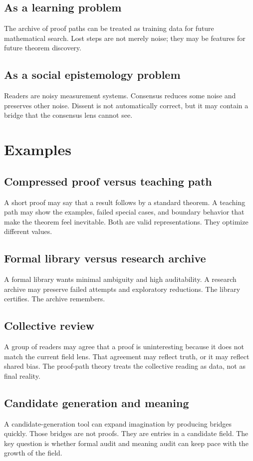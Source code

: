 \documentclass[11pt,oneside]{book}
\theoremstyle{remark}
\begin{document}
\subsection{As a learning problem}
The archive of proof paths can be treated as training data for future mathematical search.  Lost steps are not merely noise; they may be features for future theorem discovery.

\subsection{As a social epistemology problem}
Readers are noisy measurement systems.  Consensus reduces some noise and preserves other noise.  Dissent is not automatically correct, but it may contain a bridge that the consensus lens cannot see.

\section{Examples}

\subsection{Compressed proof versus teaching path}
A short proof may say that a result follows by a standard theorem.  A teaching path may show the examples, failed special cases, and boundary behavior that make the theorem feel inevitable.  Both are valid representations.  They optimize different values.

\subsection{Formal library versus research archive}
A formal library wants minimal ambiguity and high auditability.  A research archive may preserve failed attempts and exploratory reductions.  The library certifies.  The archive remembers.

\subsection{Collective review}
A group of readers may agree that a proof is uninteresting because it does not match the current field lens.  That agreement may reflect truth, or it may reflect shared bias.  The proof-path theory treats the collective reading as data, not as final reality.

\subsection{Candidate generation and meaning}
A candidate-generation tool can expand imagination by producing bridges quickly.  Those bridges are not proofs.  They are entries in a candidate field.  The key question is whether formal audit and meaning audit can keep pace with the growth of the field.
\end{document}
